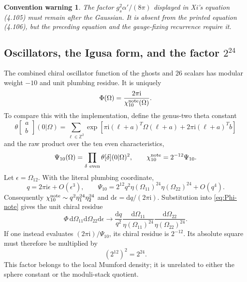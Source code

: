 \documentclass[11pt]{article}
\numberwithin{equation}{section}
\newcommand{\A}{\alpha'}
\newcommand{\dd}{\mathrm d}
\newcommand{\ii}{\mathrm i}
\newtheorem{warning}{Convention warning}
\begin{document}
\begin{warning}
The factor $g_s^2\A/(8\pi)$ displayed in Xi's equation (4.105) must remain
after the Gaussian.  It is absent from the printed equation (4.106), but the
preceding equation and the gauge-fixing recurrence require it.
\end{warning}

\subsection{Oscillators, the Igusa form, and the factor
\texorpdfstring{$2^{24}$}{2 to the 24}}

The combined chiral oscillator function of the ghosts and 26 scalars has
modular weight $-10$ and unit plumbing residue.  It is uniquely
\begin{equation}
 \Phi(\Omega)=\frac{2\pi\ii}{\chi_{10}^{\rm note}(\Omega)}.
 \label{eq:Phi-note}
\end{equation}
To compare this with the implementation, define the genus-two theta constant
\begin{equation}
 \theta\!\begin{bmatrix}a\\b\end{bmatrix}(0|\Omega)
 =\sum_{\ell\in\mathbb Z^2}
 \exp\!\left[
 \pi\ii(\ell+a)^T\Omega(\ell+a)+2\pi\ii(\ell+a)^Tb\right]
\end{equation}
and the raw product over the ten even characteristics,
\begin{equation}
 \Psi_{10}(\Omega)=\prod_{\delta\ {\rm even}}
 \theta[\delta](0|\Omega)^2,
 \qquad
 \chi_{10}^{\rm note}=2^{-12}\Psi_{10}.
 \label{eq:chi-conventions-full}
\end{equation}
Let $\epsilon=\Omega_{12}$.  With the literal plumbing coordinate,
\begin{equation}
 q=2\pi\ii\epsilon+O(\epsilon^3),
 \qquad
 \Psi_{10}=2^{12}q^2\eta(\Omega_{11})^{24}
 \eta(\Omega_{22})^{24}+O(q^4).
 \label{eq:Psi-separating}
\end{equation}
Consequently $\chi_{10}^{\rm note}\sim
q^2\eta_1^{24}\eta_2^{24}$ and
$\dd\epsilon=\dd q/(2\pi\ii)$.  Substitution into
\eqref{eq:Phi-note} gives the unit chiral residue
\begin{equation}
 \Phi\,\dd\Omega_{11}\dd\Omega_{22}\dd\epsilon
 \longrightarrow
 \frac{\dd q}{q^2}
 \frac{\dd\Omega_{11}}{\eta(\Omega_{11})^{24}}
 \frac{\dd\Omega_{22}}{\eta(\Omega_{22})^{24}}.
 \label{eq:unit-mumford-residue}
\end{equation}
If one instead evaluates $(2\pi\ii)/\Psi_{10}$, its chiral residue is
$2^{-12}$.  Its absolute square must therefore be multiplied by
\begin{equation}
 \boxed{(2^{12})^2=2^{24}.}
 \label{eq:raw-product-conversion}
\end{equation}
This factor belongs to the local Mumford density; it is unrelated to either
the sphere constant or the moduli-stack quotient.
\end{document}
